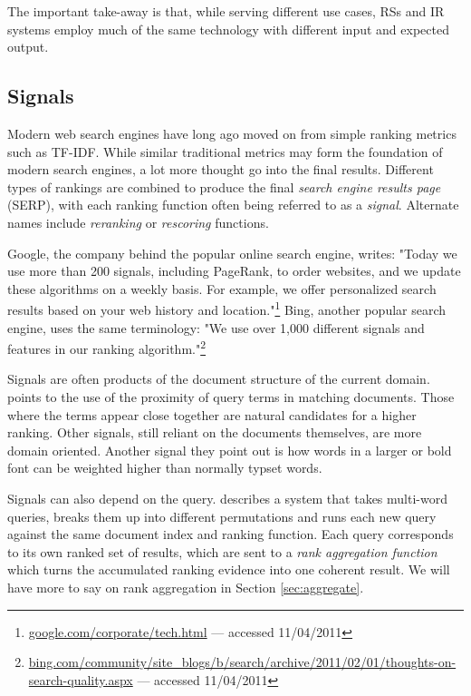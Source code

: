 The important take-away is that, while serving different use cases, RSs and IR systems 
employ much of the same technology with different input and expected output.


\subsection{Signals}

Modern web search engines have long ago moved on from simple ranking metrics such as TF-IDF.
While similar traditional metrics may form the foundation of modern search engines, a lot more thought go into the final results.
Different types of rankings are combined to produce the final \emph{search engine results page} (SERP),
with each ranking function often being referred to as a \emph{signal}. Alternate names include
\emph{reranking} or \emph{rescoring} functions.

Google, the company behind the popular online search engine, writes: "Today we use more than 200 signals, including PageRank, 
to order websites, and we update these algorithms on a weekly basis. 
For example, we offer personalized search results based on your web history and 
location."\footnote{\url{google.com/corporate/tech.html} --- accessed 11/04/2011}
Bing, another popular search engine, uses the same terminology:
"We use over 1,000 different signals and features in our ranking 
algorithm."\footnote{\url{bing.com/community/site_blogs/b/search/archive/2011/02/01/thoughts-on-search-quality.aspx} --- accessed 11/04/2011}

Signals are often products of the document structure of the current domain.
\citet[p5]{Bender2005} points to the use of the proximity of query terms in matching documents.
Those where the terms appear close together are natural candidates for a higher ranking.
Other signals, still reliant on the documents themselves, are more domain oriented.
Another signal they point out is how words in a larger or bold font can be weighted 
higher than normally typset words.

Signals can also depend on the query. \citet[p145]{Manning2008} describes a system that takes
multi-word queries, breaks them up into different permutations and runs each new query against the same
document index and ranking function. Each query corresponds to its own ranked set of results,
which are sent to a \emph{rank aggregation function} which turns the accumulated ranking evidence
into one coherent result. We will have more to say on rank aggregation in Section \ref{sec:aggregate}.  

